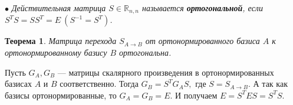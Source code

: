 $\bullet$ \textit{Действительная матрица $S\in\mathbb{R}_{n,n}$ называется \textbf{ортогональной}, если $S^T S= S S^T=E\  (S^{-1}=S^T)$.}
\newtheorem*{th14_3_2}{Теорема}\begin{th14_3_2}Матрица перехода $S_{A\rightarrow B}$ от ортонормированного базиса $A$ к ортонормированному базису $B$ ортогональна.
\end{th14_3_2}\begin{Proof}
	Пусть $G_A, G_B$ --- матрицы скалярного произведения в ортонормированных базисах $A$ и $B$ соответственно. Тогда $G_B=S^T G_A S,$ где $S=S_{A \rightarrow B}$. А так как базисы ортонормированные, то $G_A = G_B = E$. И получаем $E=S^T E S=S^T S$.
\end{Proof}











